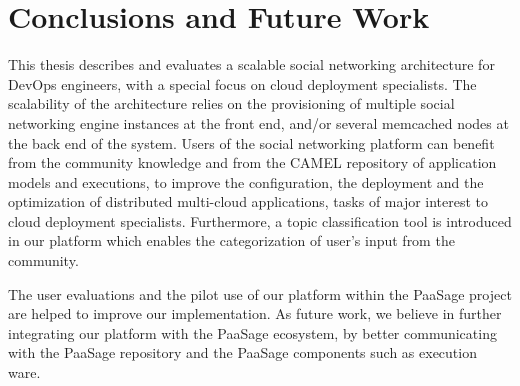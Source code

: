 \chapter{Conclusions and Future Work}
\label{sec:conclusions}
This thesis describes and evaluates a scalable social networking architecture for DevOps engineers, with a special focus on cloud deployment specialists. The scalability of the architecture relies on the provisioning of multiple social networking engine instances at the front end, and/or several memcached nodes at the back end of the system. Users of the social networking platform can benefit from the community knowledge and from the CAMEL repository of application models and executions, to improve the configuration, the deployment and the
optimization of distributed multi-cloud applications, tasks of major interest to cloud deployment specialists. 
Furthermore, a topic classification tool is introduced in our platform which enables the categorization of user's input from the community. 

The user evaluations and the pilot use of our platform within the PaaSage project are helped to improve our implementation. As future work, we believe in further integrating our platform with the PaaSage ecosystem, by better communicating with the PaaSage repository and the PaaSage components such as execution ware. 